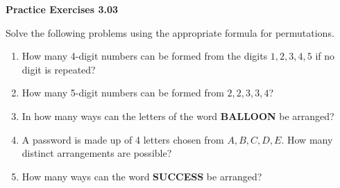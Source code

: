 \vspace{0.3ex}
\noindent\textbf{Practice Exercises 3.03}

\vspace{0.2ex}

Solve the following problems using the appropriate formula for permutations.

\begin{enumerate}[label=\color{blue}\arabic*.]
    \item How many 4-digit numbers can be formed from the digits \(1, 2, 3, 4, 5\) if no digit is repeated?
    \item How many 5-digit numbers can be formed from \(2, 2, 3, 3, 4\)?
    \item In how many ways can the letters of the word \textbf{BALLOON} be arranged?
    \item A password is made up of 4 letters chosen from \(A, B, C, D, E\). How many distinct arrangements are possible?
    \item How many ways can the word \textbf{SUCCESS} be arranged?
\end{enumerate}
